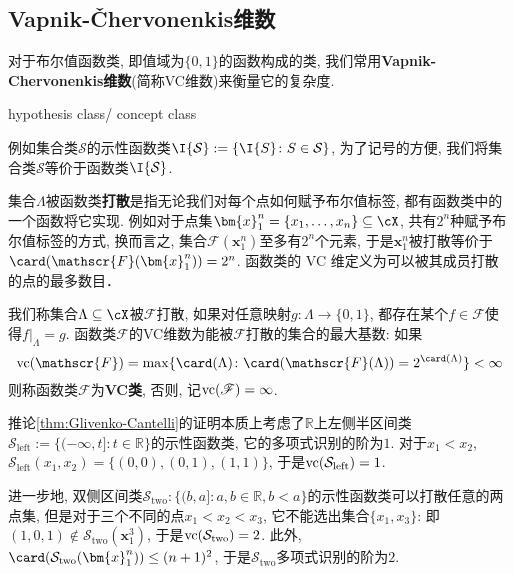\subsection{Vapnik-Čhervonenkis维数}

对于布尔值函数类, 即值域为$\{0, 1\}$的函数构成的类, 我们常用\textbf{Vapnik-Chervonenkis维数}(简称VC维数)来衡量它的复杂度. 

hypothesis class/ concept class

例如集合类$\mathcal{S}$的示性函数类$\I{\mathcal{S}} := \{\I{S} \colon S \in \mathcal{S} \}$, 为了记号的方便, 我们将集合类$\mathcal{S}$等价于函数类$\I{\mathcal{S}}$. 
 
 


集合$\Lambda$被函数类\textbf{打散}是指无论我们对每个点如何赋予布尔值标签, 都有函数类中的一个函数将它实现. 
例如对于点集$\bm{x}_1^n =\{x_1, \dots, x_n\} \subseteq \cX$, 共有$2^n$种赋予布尔值标签的方式, 换而言之, 集合$\mathscr{F}(\bm{x}_1^n)$至多有$2^n$个元素, 于是$\bm{x}_1^n$被打散等价于$\card(\mathscr{F}(\bm{x}_1^n)) = 2^n$. 
函数类的 VC 维定义为可以被其成员打散的点的最多数目．

\begin{definition}[VC维数]
	我们称集合$\Lambda \subseteq \cX$被$\mathscr{F}$打散, 如果对任意映射$g \colon \Lambda \to \{0, 1\}$, 都存在某个$f \in \mathscr{F}$使得$f|_{\Lambda} = g$.
	函数类$\mathscr{F}$的VC维数为能被$\mathscr{F}$打散的集合的最大基数: 如果
	\begin{equation*}
		\vc(\mathscr{F}) = \max \{\card(\Lambda) \colon \card(\mathscr{F}(\Lambda)) = 2^{\card(\Lambda)} \} < \infty
	\end{equation*}
	则称函数类$\mathscr{F}$为\textbf{VC类}, 否则, 记$\mathrm{vc}(\mathscr{F}) = \infty$. 
\end{definition}

\begin{example}
	推论\ref{thm:Glivenko-Cantelli}的证明本质上考虑了$\mathbb{R}$上左侧半区间类$\mathcal{S}_{\text{left}} := \{(-\infty, t] \colon t \in \mathbb{R} \}$的示性函数类, 它的多项式识别的阶为$1$. 
	对于$x_1 < x_2$, $\mathcal{S}_{\text{left}}(x_1, x_2) = \{(0,0), (0,1), (1,1)\}$, 于是$\mathrm{vc}(\mathcal{S}_{\text{left}}) = 1$. 
	
	进一步地, 双侧区间类$\mathcal{S}_{\text{two}} :\{(b, a] \colon a, b \in \mathbb{R}, b < a \}$的示性函数类可以打散任意的两点集, 但是对于三个不同的点$x_1 < x_2 < x_3$, 它不能选出集合$\{x_1, x_3\}$: 即$(1,0,1) \notin \mathcal{S}_{\text{two}}(\bm{x}_1^3)$, 于是$\mathrm{vc}(\mathcal{S}_{\text{two}}) = 2$. 
	此外, $\card(\mathcal{S}_{\text{two}}(\bm{x}_1^n)) \leq (n+1)^2$, 于是$\mathcal{S}_{\text{two}}$多项式识别的阶为$2$. 
\end{example}


